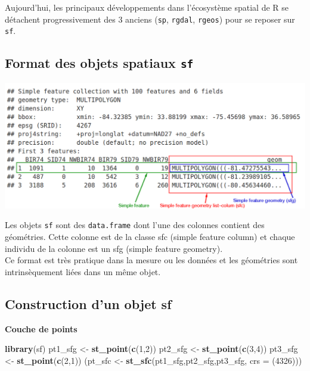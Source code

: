 \documentclass[]{book}
\newenvironment{Shaded}{\begin{snugshade}}{\end{snugshade}}
\newcommand{\KeywordTok}[1]{\textcolor[rgb]{0.13,0.29,0.53}{\textbf{#1}}}
\newcommand{\DataTypeTok}[1]{\textcolor[rgb]{0.13,0.29,0.53}{#1}}
\newcommand{\DecValTok}[1]{\textcolor[rgb]{0.00,0.00,0.81}{#1}}
\newcommand{\StringTok}[1]{\textcolor[rgb]{0.31,0.60,0.02}{#1}}
\newcommand{\NormalTok}[1]{#1}
\begin{document}
Aujourd'hui, les principaux développements dans l'écosystème spatial de
R se détachent progressivement des 3 anciens (\texttt{sp},
\texttt{rgdal}, \texttt{rgeos}) pour se reposer sur \texttt{sf}.

\subsection{\texorpdfstring{Format des objets spatiaux
\texttt{sf}}{Format des objets spatiaux sf}}\label{format-des-objets-spatiaux-sf}

\begin{center}\includegraphics[width=15.6in]{img/sf} \end{center}

Les objets \texttt{sf} sont des \texttt{data.frame} dont l'une des
colonnes contient des géométries. Cette colonne est de la classe sfc
(simple feature column) et chaque individu de la colonne est un sfg
(simple feature geometry).\\
Ce format est très pratique dans la mesure ou les données et les
géométries sont intrinsèquement liées dans un même objet.

\subsection{Construction d'un objet sf}\label{construction-dun-objet-sf}

\textbf{Couche de points}

\begin{Shaded}
\begin{Highlighting}[]
\KeywordTok{library}\NormalTok{(sf)}
\NormalTok{pt1_sfg <-}\StringTok{ }\KeywordTok{st_point}\NormalTok{(}\KeywordTok{c}\NormalTok{(}\DecValTok{1}\NormalTok{,}\DecValTok{2}\NormalTok{))}
\NormalTok{pt2_sfg <-}\StringTok{ }\KeywordTok{st_point}\NormalTok{(}\KeywordTok{c}\NormalTok{(}\DecValTok{3}\NormalTok{,}\DecValTok{4}\NormalTok{))}
\NormalTok{pt3_sfg <-}\StringTok{ }\KeywordTok{st_point}\NormalTok{(}\KeywordTok{c}\NormalTok{(}\DecValTok{2}\NormalTok{,}\DecValTok{1}\NormalTok{))}
\NormalTok{(pt_sfc <-}\StringTok{ }\KeywordTok{st_sfc}\NormalTok{(pt1_sfg,pt2_sfg,pt3_sfg, }\DataTypeTok{crs =}\NormalTok{ (}\DecValTok{4326}\NormalTok{)))}
\end{Highlighting}
\end{Shaded}
\end{document}
